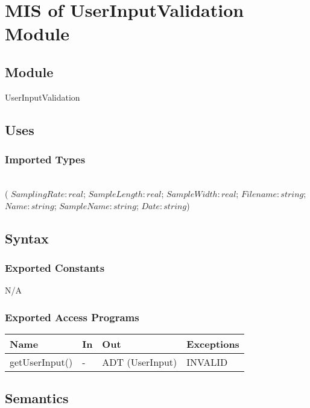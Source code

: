 \documentclass[12pt, titlepage]{article}
\begin{document}
\section{MIS of UserInputValidation Module} \label{UI} 



\subsection{Module}

UserInputValidation

\subsection{Uses}

\subsubsection{Imported Types}

 \\
( $SamplingRate: real$; $SampleLength: real$; $SampleWidth: real$; $Filename: string$; $Name: string$; $SampleName: string$; $Date: string$)

\subsection{Syntax}

\subsubsection{Exported Constants}
N/A

\subsubsection{Exported Access Programs}

\begin{center}
\begin{tabular}{p{4cm} p{2cm} p{6cm} p{2cm}}
\hline
\textbf{Name} & \textbf{In} & \textbf{Out} & \textbf{Exceptions} \\
\hline
getUserInput() & - & ADT (UserInput) & INVALID \\
\hline
\end{tabular}
\end{center}

\subsection{Semantics}
\end{document}
